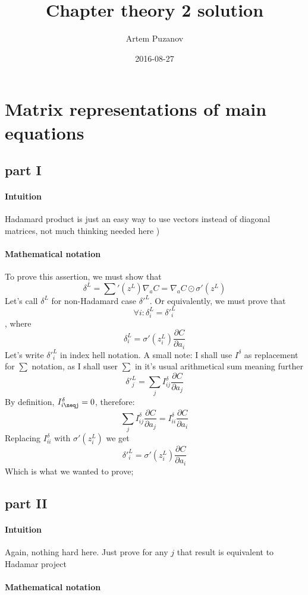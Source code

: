 \documentclass{article}
\title{Chapter theory 2 solution}
\date{2016-08-27}
\author{Artem Puzanov}
\begin{document}
\maketitle
{}
\newpage
{}

\section{Matrix representations of main equations}
\subsection{part I}
\paragraph{Intuition}
Hadamard product is just an easy way to use vectors instead of diagonal matrices, not much thinking needed here )
\paragraph{Mathematical notation}
To prove this assertion, we must show that 
$$\delta^L = {\sum}'(z^L)\nabla_aC = \nabla_aC\odot\sigma'(z^L)$$
Let's call $\delta^L$ for non-Hadamard case $\delta'^L$.
Or equivalently, we must prove that $$\forall i: \delta^L_i = \delta'^L_i$$,
where $$\delta^L_i = \sigma'(z_i^L)\frac{\partial C}{\partial a_i}$$
Let's write $\delta'^L_i$ in index hell notation. 
A small note: I shall use $I^{\delta}$ as replacement for $\sum$ notation, as I shall user $\sum$ in it's usual arithmetical sum meaning further
$$\delta'^L_j = {\sum}_{j}I^{\delta}_{ij}\frac{\partial C}{\partial a_j}$$
By definition, $I^{\delta}_{i\neqj} = 0$, therefore:
$${\sum}_{j}I^{\delta}_{ij}\frac{\partial C}{\partial a_j} = I^{\delta}_{ii} \frac{\partial C}{\partial a_i}$$
Replacing $I^{\delta}_{ii}$ with $\sigma'(z_i^L)$ we get 
$$\delta'^L_i = \sigma'(z_i^L)\frac{\partial C}{\partial a_i}$$
Which is what we wanted to prove;

\subsection{part II}
\paragraph{Intuition}
Again, nothing hard here. Just prove for any $j$ that result is equivalent to Hadamar project
\paragraph{Mathematical notation}
\end{document}
